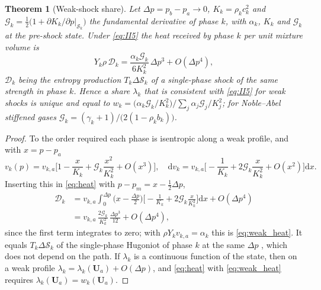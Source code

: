 \documentclass[a4paper,fleqn]{cas-sc}
\newtheorem{theorem}{Theorem}
\begin{document}
\begin{theorem}[Weak-shock share]\label{thm:weak}
Let $\Delta p=p_b-p_a\to0$, $K_k=\rho_kc_k^2$ and $\mathcal G_k=\tfrac12\big(1+\partial K_k/\partial p|_{\mathcal S_k}\big)$ the fundamental derivative of phase $k$, with
$\alpha_k$, $K_k$ and $\mathcal G_k$ at the pre-shock state. Under
\eqref{eq:II5} the heat received by phase $k$ per unit mixture volume is
\begin{equation}
Y_k\rho\,\mathcal D_k=\frac{\alpha_k\mathcal G_k}{6K_k^2}\,\Delta p^3+O(\Delta p^4),
\label{eq:weak_heat}
\end{equation}
$\mathcal D_k$ being the entropy production $T_k\Delta\mathcal S_k$ of a single-phase shock of the same strength in phase $k$. Hence a share $\lambda_k$ that is
consistent with \eqref{eq:II5} for weak shocks is unique and equal to
$w_k=\big(\alpha_k\mathcal G_k/K_k^2\big)/\sum_j\alpha_j\mathcal G_j/K_j^2$; for Noble--Abel stiffened gases $\mathcal G_k=(\gamma_k+1)/\big(2(1-\rho_kb_k)\big)$.
\end{theorem}
\begin{proof}
To the order required each phase is isentropic along a weak profile, and with $x=p-p_a$
\[
v_k(p)=v_{k,a}\Big[1-\frac{x}{K_k}+\mathcal G_k\frac{x^2}{K_k^2}+O(x^3)\Big],\quad
\mathrm dv_k=v_{k,a}\Big[-\frac1{K_k}+2\mathcal G_k\frac{x}{K_k^2}+O(x^2)\Big]\mathrm dx .
\]
Inserting this in \eqref{eq:heat} with $p-p_m=x-\tfrac12\Delta p$,
\[
\begin{aligned}
\mathcal D_k&=v_{k,a}\int_0^{\Delta p}\Big(x-\frac{\Delta p}2\Big)\Big[-\frac1{K_k}+2\mathcal G_k\frac{x}{K_k^2}\Big]\mathrm dx+O(\Delta p^4)\\
&=v_{k,a}\,\frac{2\mathcal G_k}{K_k^2}\,\frac{\Delta p^3}{12}+O(\Delta p^4),
\end{aligned}
\]
since the first term integrates to zero; with $\rho Y_kv_{k,a}=\alpha_k$ this is \eqref{eq:weak_heat}. It equals $T_k\Delta\mathcal S_k$ of the single-phase
Hugoniot of phase $k$ at the same $\Delta p$ \cite{LandauLifshitz}, which does not depend on the path. If $\lambda_k$ is a continuous function
of the state, then on a weak profile $\lambda_k=\lambda_k(\mathbf U_a)+O(\Delta p)$, and \eqref{eq:heat} with \eqref{eq:weak_heat} requires $\lambda_k(\mathbf U_a)=w_k(\mathbf U_a)$.
\end{proof}
\end{document}

